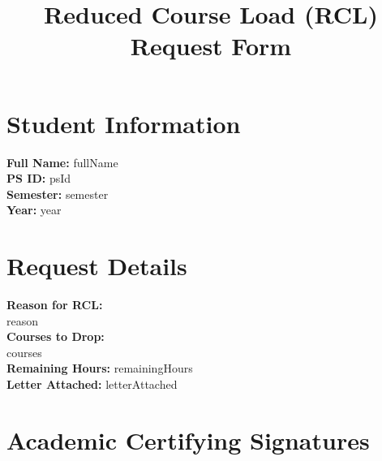 \documentclass[12pt]{article}
\title{\textbf{Reduced Course Load (RCL) Request Form}}
\author{}
\date{}
\begin{document}
\maketitle

\section*{Student Information}
\textbf{Full Name:} {{fullName}} \\[0.5em]
\textbf{PS ID:} {{psId}} \\[0.5em]
\textbf{Semester:} {{semester}} \\[0.5em]
\textbf{Year:} {{year}} \\[0.5em]

\section*{Request Details}
\textbf{Reason for RCL:} \\[0.5em]
{{reason}} \\[0.5em]

\textbf{Courses to Drop:} \\[0.5em]
{{courses}} \\[0.5em]

\textbf{Remaining Hours:} {{remainingHours}} \\[0.5em]

\textbf{Letter Attached:} {{letterAttached}} \\[0.5em]

\section*{Academic Certifying Signatures}

\end{document}

